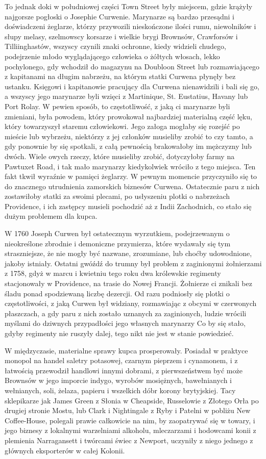 To jednak doki w południowej części Town Street były miejscem, gdzie krążyły najgorsze pogłoski o Josephie Curwenie. Marynarze są bardzo przesądni i doświadczeni żeglarze, którzy przywozili nieskończone ilości rumu, niewolników i słupy melasy, szelmowscy korsarze i wielkie brygi Brownsów, Crawforsów i Tilliinghastów, wszyscy czynili znaki ochronne, kiedy widzieli chudego, podejrzenie młodo wyglądającego człowieka o żółtych włosach, lekko pochylonego, gdy wchodził do magazynu na Doubloon Street lub rozmawiającego z kapitanami na długim nabrzeżu, na którym statki Curwena płynęły bez ustanku. Księgowi i kapitanowie pracujący dla Curwena nienawidzili i bali się go, a wszyscy jego marynarze byli wzięci z Martinique, St. Eustatius, Havany lub Port Rolay. W pewien sposób, to częstotliwość, z jaką ci marynarze byli zmieniani, była powodem, który prowokował najbardziej materialną część lęku, który towarzyszył staremu człowiekowi. Jego załoga mogłaby się rozejść po mieście lub wybrzeżu, niektórzy z jej członków musieliby zrobić to czy tamto, a gdy ponownie by się spotkali, z całą pewnością brakowałoby im mężczyzny lub dwóch. Wiele owych rzeczy, które musieliby zrobić, dotyczyłoby farmy na Pawtuxet Road, i tak mało marynarzy kiedykolwiek wróciło z tego miejsca. Ten fakt tkwił wyraźnie w pamięci żeglarzy. W pewnym momencie przyczyniło się to do znacznego utrudnienia zamorskich biznesów Curwena. Ostatecznie paru z nich zostawiłoby statki za swoimi plecami, po usłyszeniu plotki o nabrzeżach Providence, i ich zastępcy musieli pochodzić aż z Indii Zachodnich, co stało się dużym problemem dla kupca.

W 1760 Joseph Curwen był ostatecznym wyrzutkiem, podejrzewanym o nieokreślone zbrodnie i demoniczne przymierza, które wydawały się tym straszniejsze, że nie mogły być nazwane, zrozumiane, lub choćby udowodnione, jakoby istniały. Ostatni gwóźdź do trumny był problem z zaginionymi żołnierzami z 1758, gdyż w marcu i kwietniu tego roku  dwa królewskie regimenty stacjonowały w Providence, na trasie do Nowej Francji. Żołnierze ci znikali bez śladu ponad spodziewaną liczbę dezercji. Od razu podniosły się plotki o częstotliwości, z jaką Curwen był widziany, rozmawiając z obcymi w czerwonych płaszczach, a gdy paru z nich zostało uznanych za zaginionych, ludzie wrócili myślami do dziwnych przypadłości jego własnych marynarzy Co by się stało, gdyby regimenty nie ruszyły dalej, tego nikt nie jest w stanie powiedzieć. 

W międzyczasie, materialne sprawy kupca prosperowały. Posiadał w praktyce monopol na handel saletry potasowej, czarnym pieprzem i cynamonem, i z łatwością przewodził handlowi innymi dobrami, z pierwszeństwem być może Brownsów w jego imporcie indygo, wyrobów mosiężnych, bawełnianych i wełnianych, soli, żelaza, papieru i wszelkich dóbr korony brytyjskiej. Tacy sklepikarze jak James Green z Słonia w Cheapside, Russelowie z Złotego Orła po drugiej stronie Mostu, lub Clark i Nightingale z Ryby i Patelni w pobliżu New Coffee-House, polegali prawie całkowicie na nim, by zaopatrywać się w towary, i jego biznesy z lokalnymi warzelniami alkoholu, mleczarzami i hodowcami konii z plemienia Narragansett i twórcami świec z Newport, uczyniły z niego jednego z głównych eksporterów w całej Kolonii.

